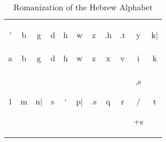 \begin{table}[ht]
\setlength{\extrarowheight}{8pt}
\centering
\caption{Romanization of the Hebrew Alphabet \citep{simaan-et-al:2001}}
\label{tab:ortho-alph}
\begin{tabular}{c c c c c c c c c c c}
\toprule %
\begin{cjhebrew}'\end{cjhebrew} & \begin{cjhebrew}b\end{cjhebrew} & \begin{cjhebrew}g\end{cjhebrew} & \begin{cjhebrew}d\end{cjhebrew} 
& \begin{cjhebrew}h\end{cjhebrew} & \begin{cjhebrew}w\end{cjhebrew} & \begin{cjhebrew}z\end{cjhebrew}& \begin{cjhebrew}.h\end{cjhebrew}
& \begin{cjhebrew}.t\end{cjhebrew} & \begin{cjhebrew}y\end{cjhebrew} & \begin{cjhebrew}k|\end{cjhebrew} \\ 
a & b & g & d 
& h & w & z & x & v & i & k \\[12pt]
\midrule
 \begin{cjhebrew}l\end{cjhebrew} & \begin{cjhebrew}m\end{cjhebrew} &
           \begin{cjhebrew}n|\end{cjhebrew} & \begin{cjhebrew}s\end{cjhebrew} & \begin{cjhebrew}`\end{cjhebrew} 
           & \begin{cjhebrew}p|\end{cjhebrew} & \begin{cjhebrew}.s\end{cjhebrew} & \begin{cjhebrew}q\end{cjhebrew} & \begin{cjhebrew}r\end{cjhebrew} & \begin{cjhebrew},s\end{cjhebrew}/\begin{cjhebrew}+s\end{cjhebrew} & \begin{cjhebrew}t\end{cjhebrew} \\

\end{tabular}
\end{table}
